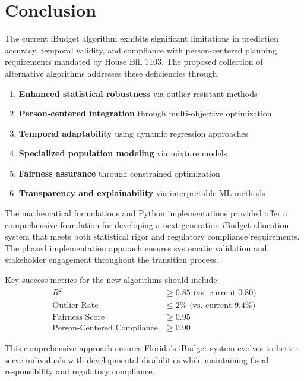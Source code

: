 \section{Conclusion}

The current iBudget algorithm exhibits significant limitations in prediction accuracy, temporal validity, and compliance with person-centered planning requirements mandated by House Bill 1103. The proposed collection of alternative algorithms addresses these deficiencies through:

\begin{enumerate}
    \item \textbf{Enhanced statistical robustness} via outlier-resistant methods
    \item \textbf{Person-centered integration} through multi-objective optimization
    \item \textbf{Temporal adaptability} using dynamic regression approaches  
    \item \textbf{Specialized population modeling} via mixture models
    \item \textbf{Fairness assurance} through constrained optimization
    \item \textbf{Transparency and explainability} via interpretable ML methods
\end{enumerate}

The mathematical formulations and Python implementations provided offer a comprehensive foundation for developing a next-generation iBudget allocation system that meets both statistical rigor and regulatory compliance requirements. The phased implementation approach ensures systematic validation and stakeholder engagement throughout the transition process.

Key success metrics for the new algorithms should include:
\begin{align}
R^2 &\geq 0.85 \text{ (vs. current 0.80)} \\
\text{Outlier Rate} &\leq 2\% \text{ (vs. current 9.4\%)} \\
\text{Fairness Score} &\geq 0.95 \\
\text{Person-Centered Compliance} &\geq 0.90
\end{align}

This comprehensive approach ensures Florida's iBudget system evolves to better serve individuals with developmental disabilities while maintaining fiscal responsibility and regulatory compliance.
